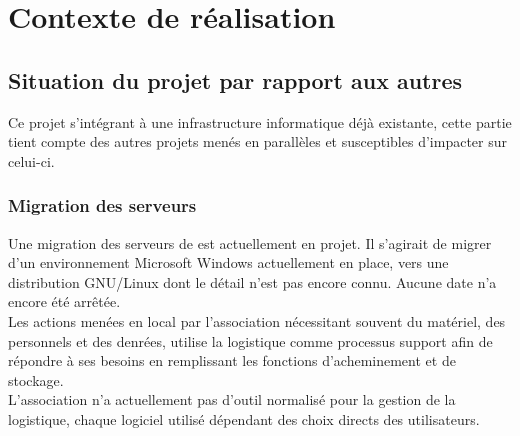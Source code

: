 \section{Contexte de réalisation}

\subsection{Situation du projet par rapport aux autres}
Ce projet s'intégrant à une infrastructure informatique déjà existante, cette partie tient compte des autres projets menés en parallèles et susceptibles d'impacter sur celui-ci.

\subsubsection{Migration des serveurs}
Une migration des serveurs de \mo est actuellement en projet. Il s'agirait de migrer d'un environnement Microsoft Windows actuellement en place, vers une distribution GNU/Linux dont le détail n'est pas encore connu. Aucune date n'a encore été arrêtée.
\\
Les actions menées en local par l'association nécessitant souvent du matériel, des personnels et des denrées,  utilise la logistique comme processus support afin de répondre à ses besoins en remplissant les fonctions d'acheminement et de stockage.
\\
L'association n'a actuellement pas d'outil normalisé pour la gestion de la logistique, chaque logiciel utilisé dépendant des choix directs des utilisateurs.


